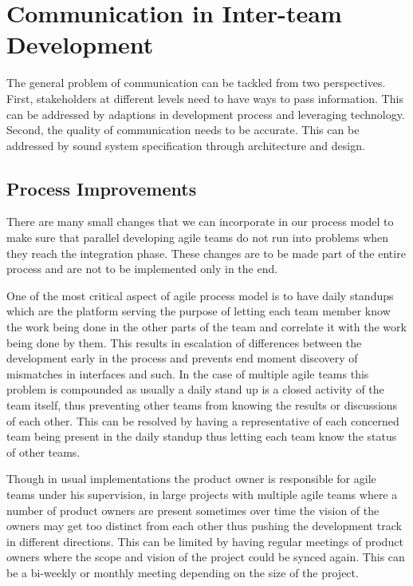 \section{Communication in Inter-team Development}
\label{sec:prop_appro} 
The general problem of communication can be tackled from two perspectives.
First, stakeholders at different levels need to have ways to pass information.
This can be addressed by adaptions in development process and leveraging technology.
Second, the quality of communication needs to be accurate.
This can be addressed by sound system specification through architecture and design.

\subsection{Process Improvements} 
\label{sec:proc_impv}
	There are many small changes \cite{collabAcrossAgile_article} that we can incorporate in our process model to make sure that parallel developing agile teams do not run into problems when they reach the integration phase.
	These changes are to be made part of the entire process and are not to be implemented only in the end.

	One of the most critical aspect of agile process model is to have daily standups which are the platform serving the purpose of letting each team member know the work being done in the other parts of the team and correlate it with the work being done by them.
	This results in escalation of differences between the development early in the process and prevents end moment discovery of mismatches in interfaces and such.
	In the case of multiple agile teams this problem is compounded as usually a daily stand up is a closed activity of the team itself, thus preventing other teams from knowing the results or discussions of each other.
	This can be resolved by having a representative of each concerned team being present in the daily standup thus letting each team know the status of other teams.

Though in usual implementations the product owner is responsible for agile teams under his supervision, in large projects with multiple agile teams where a number of product owners are present sometimes over time the vision of the owners may get too distinct from each other thus pushing the development track in different directions.
This can be limited by having regular meetings of product owners where the scope and vision of the project could be synced again. This can be a bi-weekly or monthly meeting depending on the size of the project.

